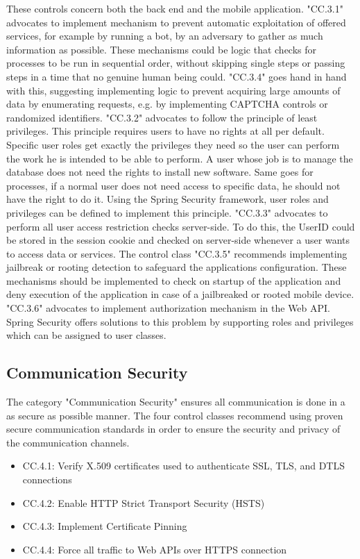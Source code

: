 These controls concern both the back end and the mobile application. "CC.3.1" advocates to implement mechanism to prevent automatic exploitation of offered services, for example by running a bot, by an adversary to gather as much information as possible. These mechanisms could be logic that checks for processes to be run in sequential order, without skipping single steps or passing steps in a time that no genuine human being could. "CC.3.4" goes hand in hand with this, suggesting implementing logic to prevent acquiring large amounts of data by enumerating requests, e.g. by implementing CAPTCHA controls or randomized identifiers. "CC.3.2" advocates to follow the principle of least privileges. This principle requires users to have no rights at all per default. Specific user roles get exactly the privileges they need so the user can perform the work he is intended to be able to perform. A user whose job is to manage the database does not need the rights to install new software. Same goes for processes, if a normal user does not need access to specific data, he should not have the right to do it. Using the Spring Security framework, user roles and privileges can be defined to implement this principle. "CC.3.3" advocates to perform all user access restriction checks server-side. To do this, the UserID could be stored in the session cookie and checked on server-side whenever a user wants to access data or services. The control class "CC.3.5" recommends implementing jailbreak or rooting detection to safeguard the applications configuration. These mechanisms should be implemented to check on startup of the application and deny execution of the application in case of a jailbreaked or rooted mobile device. "CC.3.6" advocates to implement authorization mechanism in the Web API. Spring Security offers solutions to this problem by supporting roles and privileges which can be assigned to user classes.

\subsection{Communication Security}
The category "Communication Security" ensures all communication is done in a as secure as possible manner. The four control classes recommend using proven secure communication standards in order to ensure the security and privacy of the communication channels.

\begin{itemize}
    \item CC.4.1: Verify X.509 certificates used to authenticate SSL, TLS, and DTLS connections
    \item CC.4.2: Enable HTTP Strict Transport Security (HSTS)
    \item CC.4.3: Implement Certificate Pinning
    \item CC.4.4: Force all traffic to Web APIs over HTTPS connection 
\end{itemize}

